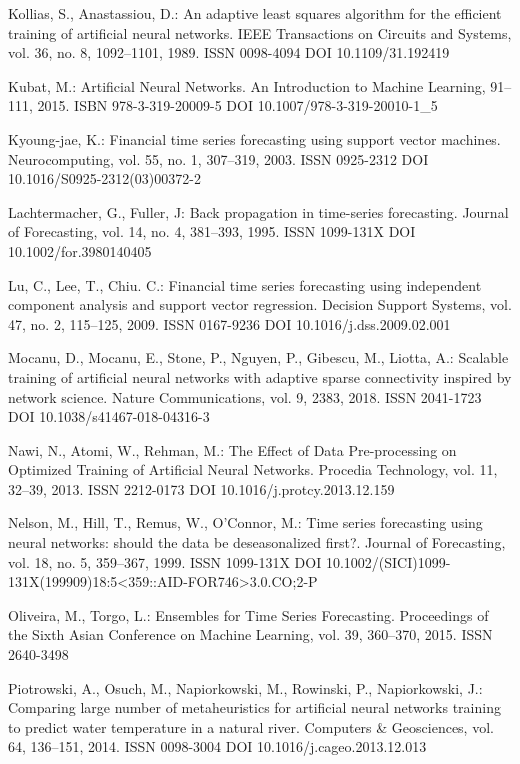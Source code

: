 \begin{thebibliography}{99.}
 Kollias, S., Anastassiou, D.: An adaptive least squares algorithm for the efficient training of artificial neural networks. IEEE Transactions on Circuits and Systems, vol. 36, no. 8, 1092--1101, 1989. ISSN 0098-4094 DOI 10.1109/31.192419

 Kubat, M.: Artificial Neural Networks. An Introduction to Machine Learning, 91--111, 2015. ISBN 978-3-319-20009-5 DOI 10.1007/978-3-319-20010-1\_5

 Kyoung-jae, K.: Financial time series forecasting using support vector machines. Neurocomputing, vol. 55, no. 1, 307--319, 2003. ISSN 0925-2312 DOI 10.1016/S0925-2312(03)00372-2

 Lachtermacher, G., Fuller, J: Back propagation in time-series forecasting. Journal of Forecasting, vol. 14, no. 4, 381--393, 1995. ISSN 1099-131X DOI 10.1002/for.3980140405

 Lu, C., Lee, T., Chiu. C.: Financial time series forecasting using independent component analysis and support vector regression. Decision Support Systems, vol. 47, no. 2, 115--125, 2009. ISSN 0167-9236 DOI 10.1016/j.dss.2009.02.001

 Mocanu, D., Mocanu, E., Stone, P., Nguyen, P., Gibescu, M., Liotta, A.: Scalable training of artificial neural networks with adaptive sparse connectivity inspired by network science. Nature Communications, vol. 9, 2383, 2018. ISSN 2041-1723 DOI 10.1038/s41467-018-04316-3

 Nawi, N., Atomi, W., Rehman, M.: The Effect of Data Pre-processing on Optimized Training of Artificial Neural Networks. Procedia Technology, vol. 11, 32--39, 2013. ISSN 2212-0173 DOI 10.1016/j.protcy.2013.12.159

 Nelson, M., Hill, T., Remus, W., O'Connor, M.: Time series forecasting using neural networks: should the data be deseasonalized first?. Journal of Forecasting, vol. 18, no. 5, 359--367, 1999. ISSN 1099-131X DOI 10.1002/(SICI)1099-131X(199909)18:5<359::AID-FOR746>3.0.CO;2-P

 Oliveira, M., Torgo, L.: Ensembles for Time Series Forecasting. Proceedings of the Sixth Asian Conference on Machine Learning, vol. 39, 360--370, 2015. ISSN 2640-3498

 Piotrowski, A., Osuch, M., Napiorkowski, M., Rowinski, P., Napiorkowski, J.: Comparing large number of metaheuristics for artificial neural networks training to predict water temperature in a natural river. Computers \& Geosciences, vol. 64, 136--151, 2014. ISSN 0098-3004 DOI 10.1016/j.cageo.2013.12.013


\end{thebibliography}
